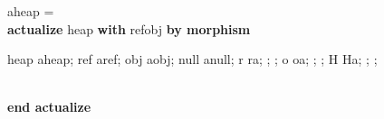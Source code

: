 \noindent aheap \label{aheap-spec} = \\
{\bf actualize} heap {\bf with} refobj {\bf by morphism}\\
\hspace*{3ex}\begin{minipage}{0.8\textwidth}
heap \Imp aheap; ref \Imp aref; obj \Imp aobj; null \Imp anull; r \Imp ra;  \Imp {};  \Imp {}; o \Imp oa;  \Imp {};  \Imp {}; H \Imp Ha;  \Imp {};  \Imp {};  \Imp {}
\end{minipage}\\
{\bf end actualize}



\noindent\mbox{}\hrulefill\mbox{}

